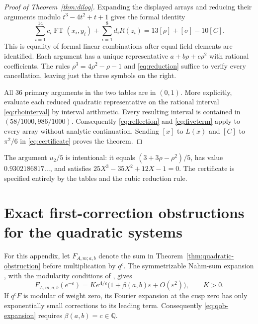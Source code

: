 \documentclass[11pt,reqno]{amsart}
\theoremstyle{remark}
\numberwithin{equation}{section}
\newcommand{\QQ}{\mathbb Q}
\DeclareMathOperator{\FT}{FT}
\begin{document}
\begin{proof}[Proof of Theorem~\ref{thm:dilog}]
Expanding the displayed arrays and reducing their arguments modulo
$t^3-4t^2+t+1$ gives the formal identity
\begin{equation}\label{eq:certificate}
 \sum_{i=1}^{14}c_i\FT(x_i,y_i)+\sum_{i=1}^{8}d_iR(z_i)
 =13[\rho]+[\sigma]-10[C].
\end{equation}
This is equality of formal linear combinations after equal field elements
are identified. Each argument has a unique representative
$a+b\rho+c\rho^2$ with rational coefficients. The rules
$\rho^3=4\rho^2-\rho-1$ and \eqref{eq:reduction} suffice to verify every
cancellation, leaving just the three symbols on the right.

All 36 primary arguments in the two tables are in $(0,1)$.
More explicitly, evaluate each reduced quadratic representative on the
rational interval \eqref{eq:rhointerval} by interval arithmetic. Every
resulting interval is contained in $(58/1000,986/1000)$.
Consequently \eqref{eq:reflection} and \eqref{eq:fiveterm} apply to every
array without analytic continuation. Sending $[x]$ to $L(x)$ and $[C]$ to
$\pi^2/6$ in \eqref{eq:certificate} proves the theorem.
\end{proof}
The argument $u_2/5$ is intentional: it equals
$(3+3\rho-\rho^2)/5$, has value $0.9302186817\ldots$, and satisfies
$25X^3-35X^2+12X-1=0$. The certificate is specified entirely by the tables
and the cubic reduction rule.

\section{Exact first-correction obstructions for the quadratic systems}
\label{app:quadratic-obstruction}
For this appendix, let $F_{A,m;a,b}$ denote the sum in
Theorem~\ref{thm:quadratic-obstruction} before multiplication by $q^c$.
The symmetrizable Nahm-sum expansion \cite[Section~2]{Mizuno}, with
the modularity conditions of \cite{VlasenkoZwegers}, gives
\begin{equation}\label{eq:qob-expansion}
 F_{A,m;a,b}(e^{-\varepsilon})
 =K e^{\Lambda/\varepsilon}
 \bigl(1+\beta(a,b)\varepsilon+O(\varepsilon^2)\bigr),\qquad K>0.
\end{equation}
If $q^cF$ is modular of weight zero, its Fourier expansion at the cusp
zero has only exponentially small corrections to its leading term.
Consequently \eqref{eq:qob-expansion} requires $\beta(a,b)=c\in\QQ$.
\end{document}
